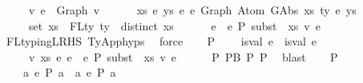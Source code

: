 \begin{isabellebody}
\ \ \ \ \ {\isasymforall}v{\isachardot}{\kern0pt}\ e{}\ {\isacharequal}{\kern0pt}\ Graph\ v\ {\isacharminus}{\kern0pt}{\isacharminus}{\kern0pt}{\isachargreater}{\kern0pt}\isanewline
\ \ \ \ \ {\isacharparenleft}{\kern0pt}{\isasymforall}xs\ e{\isacharprime}{\kern0pt}\ ys{\isachardot}{\kern0pt}\ e{}\ {\isasymsimeq}e\ Graph\ {\isacharparenleft}{\kern0pt}Atom\ {\isacharparenleft}{\kern0pt}GAbs\ xs\ ty{}\ e{\isacharprime}{\kern0pt}{\isacharparenright}{\kern0pt}\ ys{\isacharparenright}{\kern0pt}\ {\isacharminus}{\kern0pt}{\isacharminus}{\kern0pt}{\isachargreater}{\kern0pt}\isanewline
\ \ \ \ \ set\ xs\ {\isacharequal}{\kern0pt}\ FLty\ ty{}\ {\isacharminus}{\kern0pt}{\isacharminus}{\kern0pt}{\isachargreater}{\kern0pt}\ distinct\ xs\ {\isacharminus}{\kern0pt}{\isacharminus}{\kern0pt}{\isachargreater}{\kern0pt}\isanewline
\ \ \ \ \ e{}\ {\isasymcdot}\ e{}\ {\isacharminus}{\kern0pt}{\isachargreater}{\kern0pt}{\isacharbraceleft}{\kern0pt}P{\isacharbraceright}{\kern0pt}\ subst\ {}\ xs\ v\ e{\isacharprime}{\kern0pt}{\isacharparenright}{\kern0pt}{\isachardoublequoteclose}\isanewline
\ \ \ \ \isamarkupfalse%
\ FL{\isacharunderscore}{\kern0pt}typing{\isacharunderscore}{\kern0pt}LRHS\ TyApp{\isachardot}{\kern0pt}hyps{\isacharparenleft}{\kern0pt}{}{\isacharparenright}{\kern0pt}\ \isamarkupfalse%
\ force\isanewline
\ \ \isamarkupfalse%
\ P{}{\isacharcolon}{\kern0pt}\isanewline
\ \ \ \ {\isachardoublequoteopen}{\isacharparenleft}{\kern0pt}is{\isacharunderscore}{\kern0pt}val\ e{}\ {\isasymand}\ is{\isacharunderscore}{\kern0pt}val\ e{}{\isacharparenright}{\kern0pt}\ {\isacharequal}{\kern0pt}{\isacharequal}{\kern0pt}{\isachargreater}{\kern0pt}\isanewline
\ \ \ \ \ {\isasymexists}v\ xs\ e{\isacharprime}{\kern0pt}{\isachardot}{\kern0pt}\ e{}\ {\isasymcdot}\ e{}\ {\isacharminus}{\kern0pt}{\isachargreater}{\kern0pt}{\isacharbraceleft}{\kern0pt}P{\isacharbraceright}{\kern0pt}\ subst\ {}\ xs\ v\ e{\isacharprime}{\kern0pt}{\isachardoublequoteclose}\isanewline
\ \ \ \ \isamarkupfalse%
\ P{}\ P{}B\ P{}\ P{}\ \isamarkupfalse%
\ blast\isanewline
\ \ \isamarkupfalse%
\ P{}{\isacharcolon}{\kern0pt}\isanewline
\ \ \ \ {\isachardoublequoteopen}{\isacharparenleft}{\kern0pt}{\isasymexists}a{\isachardot}{\kern0pt}\ e{}\ {\isacharminus}{\kern0pt}{\isachargreater}{\kern0pt}{\isacharbraceleft}{\kern0pt}P{\isacharbraceright}{\kern0pt}\ a{\isacharparenright}{\kern0pt}\ {\isasymor}\ {\isacharparenleft}{\kern0pt}{\isasymexists}a{\isachardot}{\kern0pt}\ e{}\ {\isacharminus}{\kern0pt}{\isachargreater}{\kern0pt}{\isacharbraceleft}{\kern0pt}P{\isacharbraceright}{\kern0pt}\ a{\isacharparenright}{\kern0pt}\ {\isacharequal}{\kern0pt}{\isacharequal}{\kern0pt}{\isachargreater}{\kern0pt}\isanewline

\end{isabellebody}
